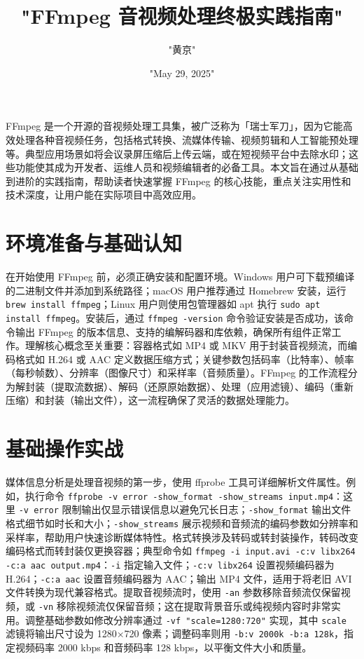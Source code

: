 \title{"FFmpeg 音视频处理终极实践指南"}
\author{"黄京"}
\date{"May 29, 2025"}
\maketitle
FFmpeg 是一个开源的音视频处理工具集，被广泛称为「瑞士军刀」，因为它能高效处理各种音视频任务，包括格式转换、流媒体传输、视频剪辑和人工智能预处理等。典型应用场景如将会议录屏压缩后上传云端，或在短视频平台中去除水印；这些功能使其成为开发者、运维人员和视频编辑者的必备工具。本文旨在通过从基础到进阶的实践指南，帮助读者快速掌握 FFmpeg 的核心技能，重点关注实用性和技术深度，让用户能在实际项目中高效应用。\par
\chapter{环境准备与基础认知}
在开始使用 FFmpeg 前，必须正确安装和配置环境。Windows 用户可下载预编译的二进制文件并添加到系统路径；macOS 用户推荐通过 Homebrew 安装，运行 \verb!brew install ffmpeg!；Linux 用户则使用包管理器如 apt 执行 \verb!sudo apt install ffmpeg!。安装后，通过 \verb!ffmpeg -version! 命令验证安装是否成功，该命令输出 FFmpeg 的版本信息、支持的编解码器和库依赖，确保所有组件正常工作。理解核心概念至关重要：容器格式如 MP4 或 MKV 用于封装音视频流，而编码格式如 H.264 或 AAC 定义数据压缩方式；关键参数包括码率（比特率）、帧率（每秒帧数）、分辨率（图像尺寸）和采样率（音频质量）。FFmpeg 的工作流程分为解封装（提取流数据）、解码（还原原始数据）、处理（应用滤镜）、编码（重新压缩）和封装（输出文件），这一流程确保了灵活的数据处理能力。\par
\chapter{基础操作实战}
媒体信息分析是处理音视频的第一步，使用 ffprobe 工具可详细解析文件属性。例如，执行命令 \verb!ffprobe -v error -show_format -show_streams input.mp4!：这里 \verb!-v error! 限制输出仅显示错误信息以避免冗长日志；\verb!-show_format! 输出文件格式细节如时长和大小；\verb!-show_streams! 展示视频和音频流的编码参数如分辨率和采样率，帮助用户快速诊断媒体特性。格式转换涉及转码或转封装操作，转码改变编码格式而转封装仅更换容器；典型命令如 \verb!ffmpeg -i input.avi -c:v libx264 -c:a aac output.mp4!：\verb!-i! 指定输入文件；\verb!-c:v libx264! 设置视频编码器为 H.264；\verb!-c:a aac! 设置音频编码器为 AAC；输出 MP4 文件，适用于将老旧 AVI 文件转换为现代兼容格式。提取音视频流时，使用 \verb!-an! 参数移除音频流仅保留视频，或 \verb!-vn! 移除视频流仅保留音频；这在提取背景音乐或纯视频内容时非常实用。调整基础参数如修改分辨率通过 \verb!-vf "scale=1280:720"! 实现，其中 \verb!scale! 滤镜将输出尺寸设为 1280×720 像素；调整码率则用 \verb!-b:v 2000k -b:a 128k!，指定视频码率 2000 kbps 和音频码率 128 kbps，以平衡文件大小和质量。\par

